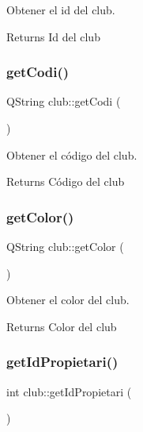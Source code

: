 Obtener el id del club. 

\begin{DoxyReturn}{Returns}
Id del club 
\end{DoxyReturn}
\mbox{\label{classclub_acc2da4046baef9b45398997c1769539a}} 
\subsubsection{\texorpdfstring{get\+Codi()}{getCodi()}}
{\footnotesize\ttfamily Q\+String club\+::get\+Codi (\begin{DoxyParamCaption}{ }\end{DoxyParamCaption})}



Obtener el código del club. 

\begin{DoxyReturn}{Returns}
Código del club 
\end{DoxyReturn}
\mbox{\label{classclub_a06ce786578d87f7e15f5372f043f6050}} 
\subsubsection{\texorpdfstring{get\+Color()}{getColor()}}
{\footnotesize\ttfamily Q\+String club\+::get\+Color (\begin{DoxyParamCaption}{ }\end{DoxyParamCaption})}



Obtener el color del club. 

\begin{DoxyReturn}{Returns}
Color del club 
\end{DoxyReturn}
\mbox{\label{classclub_a4f67353b1c96f0d89cc1e9ae2e33ba51}} 
\subsubsection{\texorpdfstring{get\+Id\+Propietari()}{getIdPropietari()}}
{\footnotesize\ttfamily int club\+::get\+Id\+Propietari (\begin{DoxyParamCaption}{ }\end{DoxyParamCaption})}



